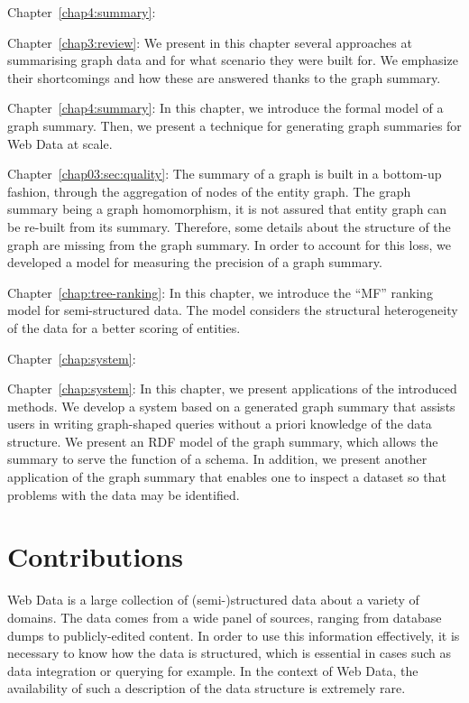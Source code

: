 
\begin{labeling}{Chapter~\ref{chap4:summary}:}
\item[Chapter~\ref{chap3:review}:] We present in this chapter several approaches at summarising graph data and for what scenario they were built for. We emphasize their shortcomings and how these are answered thanks to the graph summary.
\item[Chapter~\ref{chap4:summary}:] In this chapter, we introduce the formal model of a graph summary. Then, we present a technique for generating graph summaries for Web Data at scale.
\item[Chapter~\ref{chap03:sec:quality}:] The summary of a graph is built in a bottom-up fashion, through the aggregation of nodes of the entity graph. The graph summary being a graph homomorphism, it is not assured that entity graph can be re-built from its summary. Therefore, some details about the structure of the graph are missing from the graph summary. In order to account for this loss, we developed a model for measuring the precision of a graph summary.
\item[Chapter~\ref{chap:tree-ranking}:] In this chapter, we introduce the ``MF'' ranking model for semi-structured data. The model considers the structural heterogeneity of the data for a better scoring of entities.
\end{labeling}


\begin{labeling}{Chapter~\ref{chap:system}:}
\item[Chapter~\ref{chap:system}:] In this chapter, we present applications of the introduced methods. We develop a system based on a generated graph summary that assists users in writing graph-shaped queries without a priori knowledge of the data structure. We present an RDF model of the graph summary, which allows the summary to serve the function of a schema. In addition, we present another application of the graph summary that enables one to inspect a dataset so that problems with the data may be identified.
\end{labeling}

\section{Contributions}

Web Data is a large collection of (semi-)structured data about a variety of domains. The data comes from a wide panel of sources, ranging from database dumps to publicly-edited content. In order to use this information effectively, it is necessary to know how the data is structured, which is essential in cases such as data integration or querying for example. In the context of Web Data, the availability of such a description of the data structure is extremely rare.

